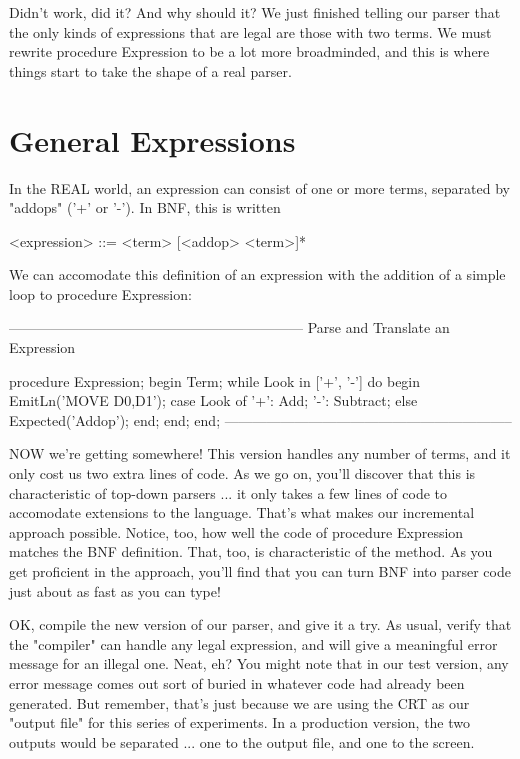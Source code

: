 \documentclass[float=false, crop=false]{standalone}
\begin{document}
Didn't work, did it? And why should it? We just finished telling our parser that
the only kinds of expressions that are legal are those with two terms. We must
rewrite procedure Expression to be a lot more broadminded, and this is where
things start to take the shape of a real parser.




\section{General Expressions}

In the REAL world, an expression can consist of one or more terms, separated by
"addops" ('+' or '-'). In BNF, this is written

          <expression> ::= <term> [<addop> <term>]*


We can accomodate this definition of an expression with the addition of a simple
loop to procedure Expression:

\begin{code}
{---------------------------------------------------------------}
{ Parse and Translate an Expression }

procedure Expression;
begin
   Term;
   while Look in ['+', '-'] do begin
      EmitLn('MOVE D0,D1');
      case Look of
       '+': Add;
       '-': Subtract;
      else Expected('Addop');
      end;
   end;
end;
{--------------------------------------------------------------}
\end{code}

NOW we're getting somewhere! This version handles any number of terms, and it
only cost us two extra lines of code. As we go on, you'll discover that this is
characteristic of top-down parsers ... it only takes a few lines of code to
accomodate extensions to the language. That's what makes our incremental
approach possible. Notice, too, how well the code of procedure Expression
matches the BNF definition. That, too, is characteristic of the method. As you
get proficient in the approach, you'll find that you can turn BNF into parser
code just about as fast as you can type!

OK, compile the new version of our parser, and give it a try. As usual, verify
that the "compiler" can handle any legal expression, and will give a meaningful
error message for an illegal one. Neat, eh? You might note that in our test
version, any error message comes out sort of buried in whatever code had already
been generated. But remember, that's just because we are using the CRT as our
"output file" for this series of experiments. In a production version, the two
outputs would be separated ... one to the output file, and one to the screen.
\end{document}
